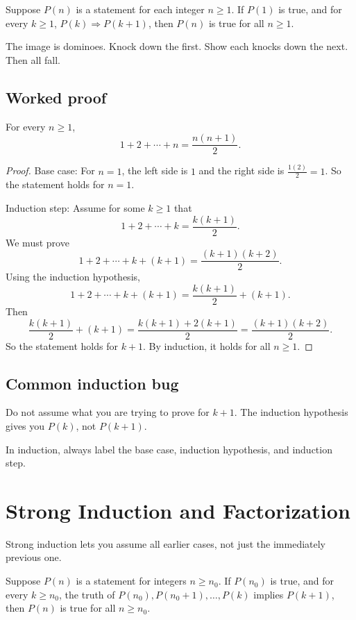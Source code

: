 \documentclass[11pt]{article}
\begin{document}
\begin{theorem}
Suppose $P(n)$ is a statement for each integer $n\geq 1$. If $P(1)$ is true, and for every $k\geq1$, $P(k)\Rightarrow P(k+1)$, then $P(n)$ is true for all $n\geq1$.
\end{theorem}

The image is dominoes. Knock down the first. Show each knocks down the next. Then all fall.

\subsection{Worked proof}

\begin{theorem}
For every $n\geq1$,
\[
1+2+\cdots+n=\frac{n(n+1)}{2}.
\]
\end{theorem}

\begin{proof}
Base case: For $n=1$, the left side is $1$ and the right side is $\frac{1(2)}2=1$. So the statement holds for $n=1$.

Induction step: Assume for some $k\geq1$ that
\[
1+2+\cdots+k=\frac{k(k+1)}2.
\]
We must prove
\[
1+2+\cdots+k+(k+1)=\frac{(k+1)(k+2)}2.
\]
Using the induction hypothesis,
\[
1+2+\cdots+k+(k+1)=\frac{k(k+1)}2+(k+1).
\]
Then
\[
\frac{k(k+1)}2+(k+1)=\frac{k(k+1)+2(k+1)}2
=\frac{(k+1)(k+2)}2.
\]
So the statement holds for $k+1$. By induction, it holds for all $n\geq1$.
\end{proof}

\subsection{Common induction bug}

Do not assume what you are trying to prove for $k+1$. The induction hypothesis gives you $P(k)$, not $P(k+1)$.

\begin{focusbox}
In induction, always label the base case, induction hypothesis, and induction step.
\end{focusbox}

\newpage
\section{Strong Induction and Factorization}

Strong induction lets you assume all earlier cases, not just the immediately previous one.

\begin{theorem}
Suppose $P(n)$ is a statement for integers $n\geq n_0$. If $P(n_0)$ is true, and for every $k\geq n_0$, the truth of $P(n_0),P(n_0+1),\ldots,P(k)$ implies $P(k+1)$, then $P(n)$ is true for all $n\geq n_0$.
\end{theorem}
\end{document}
